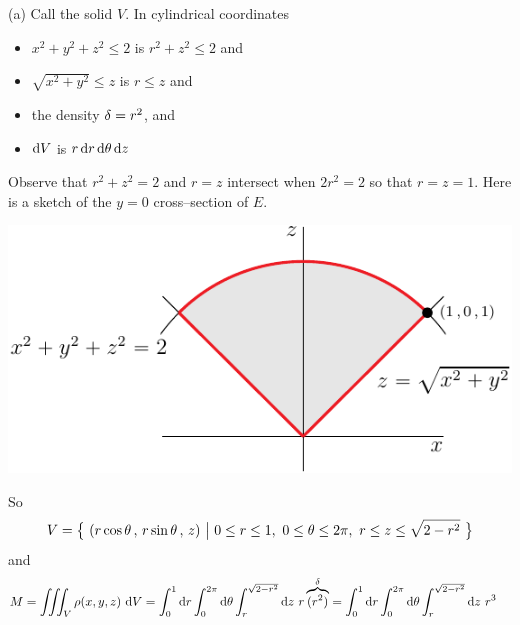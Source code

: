 \begin{solution}
(a)
Call the solid $V$.
In cylindrical coordinates
\begin{itemize}
\item
$x^2+y^2+z^2\le 2$ is $r^2+z^2\le 2$ and
\item
$\sqrt{x^2+y^2}\le z$ is $r\le z$ and
\item
the density $\delta=r^2$, and
\item
$\mathrm{d}V$ is $r\,\mathrm{d}r\,\mathrm{d}\theta\,\mathrm{d}z$
\end{itemize}
Observe that $r^2+z^2= 2$ and $r= z$ intersect when $2r^2=2$ so that $r=z=1$.
Here is a sketch of the $y=0$ cross--section of $E$.
\begin{center}
     \includegraphics[scale=1.0]{fig/OE09A_7.pdf}
\end{center}
So
\begin{equation*}
V =\Set{(r\cos\theta\,,\,r\sin\theta\,,\,z)}{0\le r\le 1,\ 
                                             0\le\theta\le2\pi,\ 
                                              r\le z\le \sqrt{2-r^2}}
\end{equation*}
and
\begin{align*}
M &=\iiint_V \rho(x,y,z)\ \mathrm{d}V 
   =\int_0^1\mathrm{d}r\int_0^{2\pi}\mathrm{d}\theta
           \int_r^{\sqrt{2-r^2}}\mathrm{d}z\ r\overbrace{(r^2)}^{\delta}
   =\int_0^1\mathrm{d}r\int_0^{2\pi}\mathrm{d}\theta
           \int_r^{\sqrt{2-r^2}}\mathrm{d}z\ r^3
\end{align*}


\end{solution}
